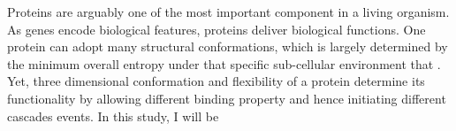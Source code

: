 Proteins are arguably one of the most important component in a living organism. As genes encode biological features, proteins deliver biological functions. One protein can adopt many structural conformations, which is largely determined by the minimum overall entropy under that specific sub-cellular environment that . Yet, three dimensional conformation and flexibility of a protein determine its functionality by allowing different binding property and hence initiating different cascades events. In this study, I will be 